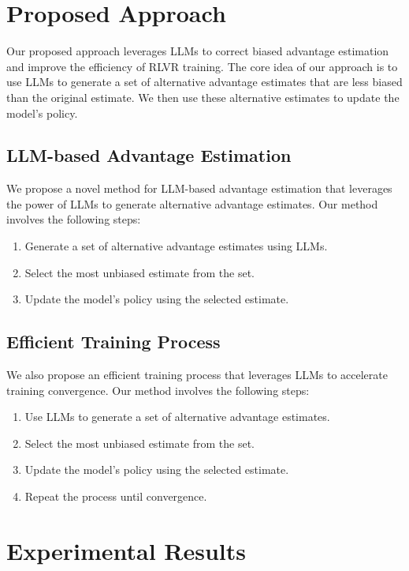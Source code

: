 \documentclass{article}
\begin{document}
\section{Proposed Approach}

Our proposed approach leverages LLMs to correct biased advantage estimation and improve the efficiency of RLVR training. The core idea of our approach is to use LLMs to generate a set of alternative advantage estimates that are less biased than the original estimate. We then use these alternative estimates to update the model's policy.

\subsection{LLM-based Advantage Estimation}

We propose a novel method for LLM-based advantage estimation that leverages the power of LLMs to generate alternative advantage estimates. Our method involves the following steps:

\begin{enumerate}
\item Generate a set of alternative advantage estimates using LLMs.
\item Select the most unbiased estimate from the set.
\item Update the model's policy using the selected estimate.
\end{enumerate}

\subsection{Efficient Training Process}

We also propose an efficient training process that leverages LLMs to accelerate training convergence. Our method involves the following steps:

\begin{enumerate}
\item Use LLMs to generate a set of alternative advantage estimates.
\item Select the most unbiased estimate from the set.
\item Update the model's policy using the selected estimate.
\item Repeat the process until convergence.
\end{enumerate}

\section{Experimental Results}
\end{document}
